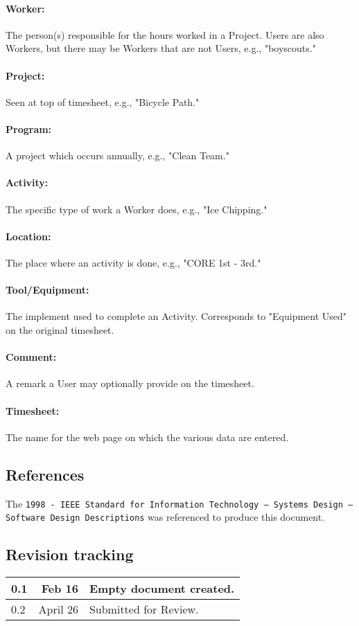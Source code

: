 \documentclass[12pt]{article}
\begin{document}
\paragraph{Worker:} The person(s) responsible for the hours worked in a Project. Users are also Workers, but there may be Workers that are not Users, e.g., "boyscouts."
\paragraph{Project:} Seen at top of timesheet, e.g., "Bicycle Path."
\paragraph{Program:} A project which occurs annually, e.g., "Clean Team."
\paragraph{Activity:} The specific type of work a Worker does, e.g., "Ice Chipping."
\paragraph{Location:} The place where an activity is done, e.g., "CORE 1st - 3rd."
\paragraph{Tool/Equipment:} The implement used to complete an Activity. Corresponds to "Equipment Used" on the original timesheet.
\paragraph{Comment:} A remark a User may optionally provide on the timesheet.
\paragraph{Timesheet:} The name for the web page on which the various data are entered.

\subsection{References}
The {\tt 1998 - IEEE Standard for Information Technology -- Systems Design -- Software Design Descriptions} was referenced to produce this document.

\subsection{Revision tracking}
\begin{tabular}{|l|r|p{4.6in}|}
\hline
0.1 & Feb 16 & Empty document created.\\
\hline
0.2 & April 26 & Submitted for Review.\\
\hline
\end{tabular}
\end{document}

